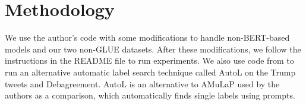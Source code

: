 

\section{Methodology}
\label{section:methodology}

We use the author's code with some modifications to handle non-BERT-based models and our two non-GLUE datasets. After these modifications, we follow the instructions in the README file to run experiments. We also use code from \citet{gao-etal-2021-making} to run an alternative automatic label search technique called AutoL on the Trump tweets and Debagreement. AutoL is an alternative to AMuLaP used by the authors as a comparison, which automatically finds single labels using prompts.

